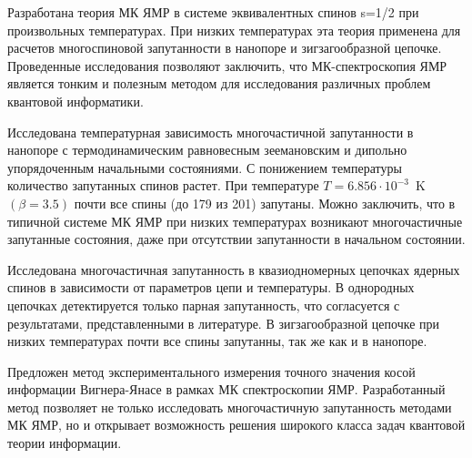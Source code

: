 \item
Разработана теория МК ЯМР в системе эквивалентных спинов s=1/2 при произвольных температурах. При низких температурах эта теория применена для расчетов многоспиновой запутанности в
нанопоре и зигзагообразной цепочке. 
Проведенные исследования позволяют заключить, что МК-спектроскопия ЯМР является тонким и полезным методом для исследования различных проблем квантовой информатики.

\item
Исследована температурная зависимость многочастичной запутанности в нанопоре с термодинамическим равновесным зеемановским и дипольно упорядоченным начальными состояниями. 
С понижением температуры количество запутанных спинов растет.
При температуре
$T = 6.856\cdot10^{-3}$~K $(\beta=3.5)$
почти все спины (до 179 из 201) запутаны. 
Можно заключить, что в типичной системе МК ЯМР при низких температурах возникают многочастичные запутанные состояния,
даже при отсутствии запутанности в начальном состоянии.  


\item
Исследована многочастичная запутанность в квазиодномерных цепочках ядерных спинов в зависимости от параметров цепи и температуры.
В однородных цепочках детектируется только парная запутанность, что согласуется с результатами, представленными в литературе.
В зигзагообразной цепочке при низких температурах почти все спины запутанны, так же как и в нанопоре.

\item
Предложен метод экспериментального измерения точного значения косой информации Вигнера-Янасе в рамках МК спектроскопии ЯМР.
Разработанный метод позволяет не только исследовать многочастичную запутанность методами МК ЯМР,
но и открывает возможность решения широкого класса задач квантовой теории информации.
